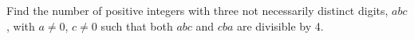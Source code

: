 Find the number of positive integers with three not necessarily distinct digits, $abc$, with $a \neq 0$, $c \neq 0$ such that both $abc$ and $cba$ are divisible by 4.